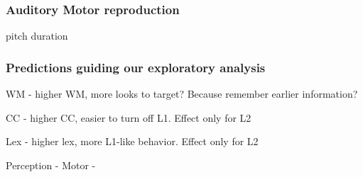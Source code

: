 \subsubsection{Auditory Motor reproduction}
pitch
duration



\subsubsection{Predictions guiding our exploratory analysis} 
WM - higher WM, more looks to target? Because remember earlier information? 

CC - higher CC, easier to turn off L1. Effect only for L2

Lex - higher lex, more L1-like behavior. Effect only for L2

Perception - 
Motor - 